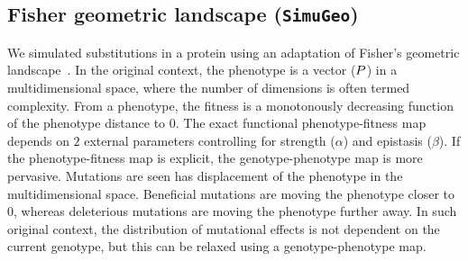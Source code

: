 \begin{table}[H]
    \centering
    \noindent{}
    \caption[Inferred amino-acid entropy for \texttt{SimuPoly}]{
        Estimated amino-acid entropy under simulation accounting for finite population effects, site linkage and short term fluctuation of $\Ne$.
        Estimation is obtained with the mechanistic inference model developed in this paper of site-specific amino-acid fitness profiles and log-Brownian process for $\Ne$, $\mu$ and life-history traits (in the left column), or under the assumption of constant $\Ne$ (in the right column).}
\end{table}

\subsection{Fisher geometric landscape (\texttt{SimuGeo})}
\label{subsec:fisher-geometric-landscape}

We simulated substitutions in a protein using an adaptation of Fisher's geometric landscape~\citep{Tenaillon2014,Blanquart2016}.
In the original context, the {phenotype} is a vector ($P$) in a multidimensional space, where the number of dimensions is often termed complexity.
From a {phenotype}, the fitness is a monotonously decreasing function of the {phenotype} distance to $0$.
The exact functional phenotype-fitness map depends on $2$ external parameters controlling for strength ($\alpha$) and epistasis ($\beta$).
If the phenotype-fitness map is explicit, the genotype-phenotype map is more pervasive.
Mutations are seen has displacement of the {phenotype} in the multidimensional space.
Beneficial mutations are moving the {phenotype} closer to $0$, whereas deleterious mutations are moving the {phenotype} further away.
In such original context, the distribution of mutational effects is not dependent on the current genotype, but this can be relaxed using a genotype-phenotype map.\\

